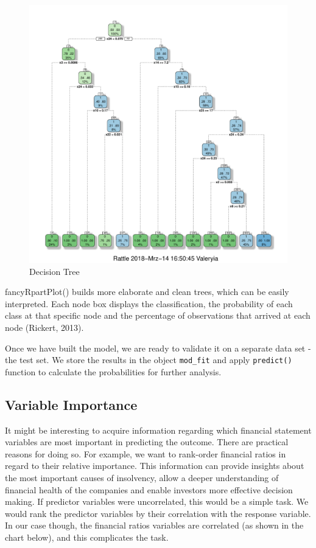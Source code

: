\documentclass{article}
\begin{document}
\begin{figure}
\caption{Decision Tree}
\includegraphics[scale=0.8]{../CART/fancyRpartPlot.pdf}
\end{figure}

fancyRpartPlot() builds more elaborate and clean trees, which can be easily interpreted. Each node box displays the classification, the probability of each class at that specific node and the percentage of observations that arrived at each node (Rickert, 2013). 

Once we have built the model, we are ready to validate it on a separate data set - the test set. We store the results in the object \texttt{mod\_fit} and apply \texttt{predict()} function to calculate the probabilities for further analysis. 

\subsection{Variable Importance}

It might be interesting to acquire information regarding which financial statement variables are most important in predicting the outcome. There are practical reasons for doing so. For example, we want to rank-order financial ratios in regard to their relative importance. This information can provide insights about the most important causes of insolvency, allow a deeper understanding of financial health of the companies and enable investors more effective decision making. If predictor variables were uncorrelated, this would be a simple task. We would rank the predictor variables by their correlation with the response variable. In our case though, the financial ratios variables are correlated (as shown in the chart below), and this complicates the task.
 
\end{document}
